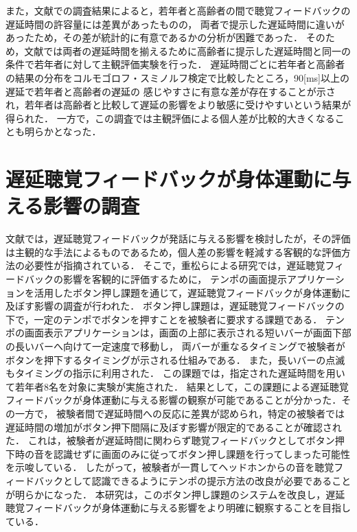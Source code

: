 また，文献\cite{shigematu-toukyoushibu}での調査結果によると，若年者と高齢者の間で聴覚フィードバックの遅延時間の許容量には差異があったものの，
両者で提示した遅延時間に違いがあったため，その差が統計的に有意であるかの分析が困難であった．
そのため，文献\cite{kayama}では両者の遅延時間を揃えるために高齢者に提示した遅延時間と同一の条件で若年者に対して主観評価実験を行った．
遅延時間ごとに若年者と高齢者の結果の分布をコルモゴロフ・スミノルフ検定で比較したところ，90[ms]以上の遅延で若年者と高齢者の遅延の
感じやすさに有意な差が存在することが示され，若年者は高齢者と比較して遅延の影響をより敏感に受けやすいという結果が得られた．
一方で，この調査では主観評価による個人差が比較的大きくなることも明らかとなった．
\section{遅延聴覚フィードバックが身体運動に与える影響の調査}
文献\cite{kayama}では，遅延聴覚フィードバックが発話に与える影響を検討したが，その評価は主観的な手法によるものであるため，個人差の影響を軽減する客観的な評価方法の必要性が指摘されている．
そこで，重松らによる研究\cite{shigematu}では，遅延聴覚フィードバックの影響を客観的に評価するために，
テンポの画面提示アプリケーション\cite{Syuuronn-shigematu}を活用したボタン押し課題を通じて，遅延聴覚フィードバックが身体運動に及ぼす影響の調査が行われた．
ボタン押し課題は，遅延聴覚フィードバックの下で，一定のテンポでボタンを押すことを被験者に要求する課題である．
テンポの画面表示アプリケーションは，画面の上部に表示される短いバーが画面下部の長いバーへ向けて一定速度で移動し，
両バーが重なるタイミングで被験者がボタンを押下するタイミングが示される仕組みである．
また，長いバーの点滅もタイミングの指示に利用された．
この課題では，指定された遅延時間を用いて若年者8名を対象に実験が実施された．
結果として，この課題による遅延聴覚フィードバックが身体運動に与える影響の観察が可能であることが分かった．その一方で，
被験者間で遅延時間への反応に差異が認められ，特定の被験者では遅延時間の増加がボタン押下間隔に及ぼす影響が限定的であることが確認された．
これは，被験者が遅延時間に関わらず聴覚フィードバックとしてボタン押下時の音を認識せずに画面のみに従ってボタン押し課題を行ってしまった可能性を示唆している．
したがって，被験者が一貫してヘッドホンからの音を聴覚フィードバックとして認識できるようにテンポの提示方法の改良が必要であることが明らかになった．
本研究は，このボタン押し課題のシステムを改良し，遅延聴覚フィードバックが身体運動に与える影響をより明確に観察することを目指している．
